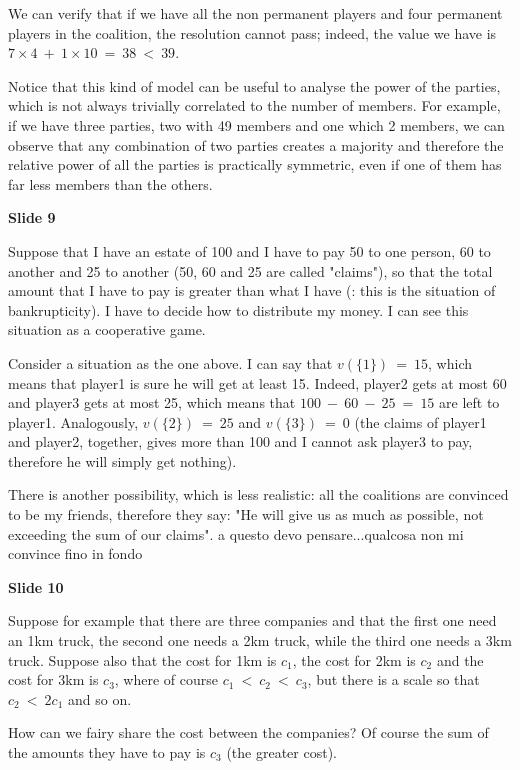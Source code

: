 \noindent We can verify that if we have all the non permanent players and four 
permanent players in the coalition, the resolution cannot pass; indeed, the 
value we have is $7 \times 4 ~+~ 1 \times 10 ~=~ 38 ~<~ 39$.

\noindent Notice that this kind of model can be useful to analyse the power 
of the parties, which is not always trivially correlated to the number of 
members. For example, if we have three parties, two with 49 members and one 
which 2 members, we can observe that any combination of two parties creates 
a majority and therefore the relative power of all the parties is practically 
symmetric, even if one of them has far less members than the others.

\bigskip
\noindent \textbf{Slide 9}

\noindent Suppose that I have an estate of 100 and I have to pay 50 to one 
person, 60 to another and 25 to another (50, 60 and 25 are called "claims"), 
so that the total amount that I 
have to pay is greater than what I have (: this is the situation of 
bankrupticity). I have to decide how to distribute my money. I can see this 
situation as a cooperative game.

\noindent Consider a situation as the one above. I can say that $v(\{1\})~=~15$, 
which means that player1 is sure he will get at least 15. Indeed, player2 gets 
at most 60 and player3 gets at most 25, which means that $100~-~60~-~25~=~15$ 
are left to player1. Analogously, $v(\{2\})~=~25$ and $v(\{3\})~=~0$ (the claims 
of player1 and player2, together, gives more than 100 and I cannot ask player3 
to pay, therefore he will simply get nothing).

\noindent There is another possibility, which is less realistic: all the 
coalitions are convinced to be my friends, therefore they say: "He will give 
us as much as possible, not exceeding the sum of our claims". {\huge a questo 
devo pensare...qualcosa non mi convince fino in fondo}

\bigskip
\noindent \textbf{Slide 10}

\noindent Suppose for example that there are three companies and that the 
first one need an 1km truck, the second one needs a 2km truck, while the 
third one needs a 3km truck. Suppose also that the cost for 1km is $c_1$, 
the cost for 2km is $c_2$ and the cost for 3km is $c_3$, where of course 
$c_1~<~c_2~<~c_3$, but there is a scale so that $c_2~<~2c_1$ and so on.

\noindent How can we fairy share the cost between the companies? Of course 
the sum of the amounts they have to pay is $c_3$ (the greater cost).

